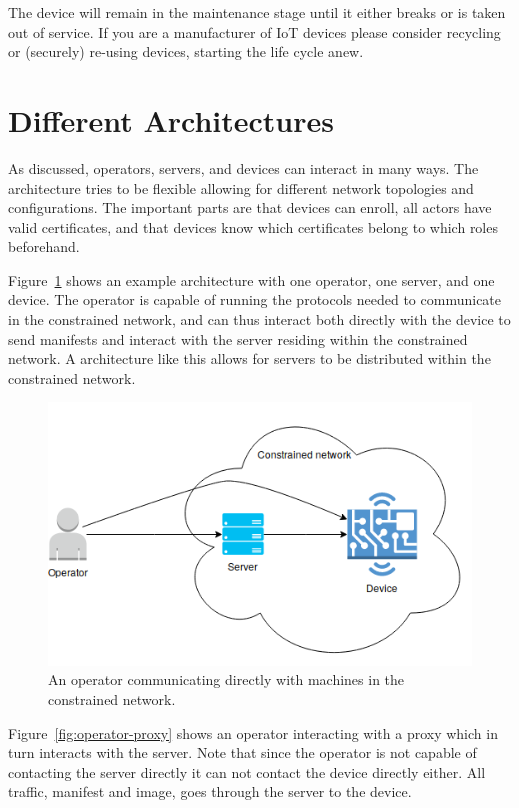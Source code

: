 \documentclass[0-thesis.tex]{subfiles}
\begin{document}
The device will remain in the maintenance stage until it either breaks or is taken out of
service. If you are a manufacturer of IoT devices please consider recycling or (securely)
re-using devices, starting the life cycle anew.


\section{Different Architectures}
\label{ssec:different-architectures}
As discussed, operators, servers, and devices can interact in many ways. The architecture
tries to be flexible allowing for different network topologies and configurations. The
important parts are that devices can enroll, all actors have valid certificates, and that
devices know which certificates belong to which roles beforehand. 

Figure~\ref{fig:operator-direct} shows an example architecture with one operator, one
server, and one device. The operator is capable of running the protocols needed to
communicate in the constrained network, and can thus interact both directly with the
device to send manifests and interact with the server residing within the constrained
network. A architecture like this allows for servers to be distributed within the
constrained network.

\begin{figure}
    \caption{An operator communicating directly with machines in the constrained network.}
    \label{fig:operator-direct}
    \includegraphics[scale=0.8]{images/operator-direct.png}
\end{figure}

Figure~\ref{fig:operator-proxy} shows an operator interacting with a proxy which in turn
interacts with the server. Note that since the operator is not capable of contacting the
server directly it can not contact the device directly either. All traffic, manifest and
image, goes through the server to the device. 
\end{document}
